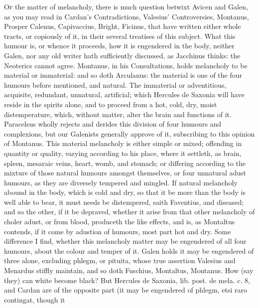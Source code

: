 {\lettrine{O}{f} the matter of melancholy, there is much question betwixt Avicen and
Galen, as you may read in Cardan's Contradictions,
Valesius' Controversies, Montanus, Prosper Calenus, Capivaccius,
Bright, Ficinus, that have written either whole tracts, or
copiously of it, in their several treatises of this subject. What
this humour is, or whence it proceeds, how it is engendered in the
body, neither Galen, nor any old writer hath sufficiently discussed, as
Jacchinus thinks: the Neoterics cannot agree. Montanus, in his
Consultations, holds melancholy to be material or immaterial: and so
doth Arculanus: the material is one of the four humours before
mentioned, and natural. The immaterial or adventitious, acquisite,
redundant, unnatural, artificial; which  Hercules de Saxonia will
have reside in the spirits alone, and to proceed from a hot, cold, dry,
moist distemperature, which, without matter, alter the brain and
functions of it. Paracelsus wholly rejects and derides this division of
four humours and complexions, but our Galenists generally approve of
it, subscribing to this opinion of Montanus.
This material melancholy is either simple or mixed; offending in
quantity or quality, varying according to his place, where it settleth,
as brain, spleen, mesaraic veins, heart, womb, and stomach; or
differing according to the mixture of those natural humours amongst
themselves, or four unnatural adust humours, as they are diversely
tempered and mingled. If natural melancholy abound in the body, which
is cold and dry, so that it be more than the body is well able to
bear, it must needs be distempered, saith Faventius, and diseased; and
so the other, if it be depraved, whether it arise from that other
melancholy of choler adust, or from blood, produceth the like effects,
and is, as Montaltus contends, if it come by adustion of humours, most
part hot and dry. Some difference I find, whether this melancholy
matter may be engendered of all four humours, about the colour and
temper of it. Galen holds it may be engendered of three alone,
excluding phlegm, or pituita, whose true assertion Valesius and
Menardus stiffly maintain, and so doth Fuschius, Montaltus,
 Montanus. How (say they) can white become black? But Hercules de
Saxonia, lib. post. de mela. c. 8, and Cardan are of the opposite
part (it may be engendered of phlegm, etsi raro contingat, though it
}
